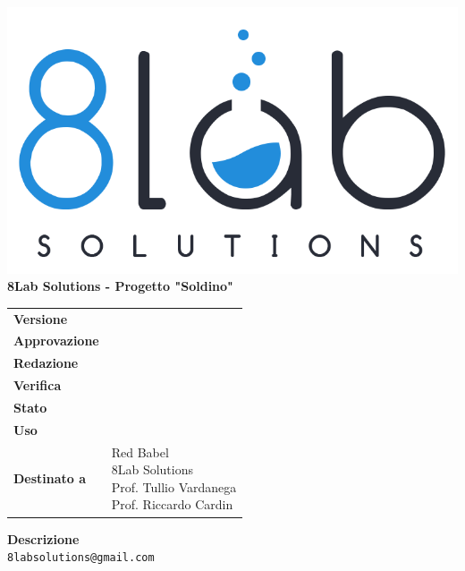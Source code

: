 \thispagestyle{empty}
\begin{titlepage}
	\begin{center}
		\includegraphics[scale = 0.3]{res/images/logo8_crop.png}\\
		\large \textbf{8Lab Solutions - Progetto "Soldino"} \\
		\vfill
		\Huge \textbf{\doctitle}
		\vspace*{\fill}
        
        \vfill
        \large
    \end{center}
	\begin{table}[htbp]
        \centering
        \hspace*{2cm}
        \begin{tabular}{l|l}
            \textbf{Versione} & \rev{} \\
            \textbf{Approvazione} & \approv{} \\
            \textbf{Redazione} & \red{} \\
            \textbf{Verifica} & \ver{} \\
            \textbf{Stato} & \stato{} \\
            \textbf{Uso} & \uso{} \\
            \textbf{Destinato a} & \parbox[t]{5cm}{Red Babel \\8Lab Solutions
            \\Prof. Tullio Vardanega\\Prof. Riccardo Cardin}
        \end{tabular}
    \end{table}
    \begin{center}
        \vfill
        \normalsize
        \textbf{Descrizione}\\
		\describedoc
        \vfill
        \small
        \texttt{8labsolutions@gmail.com}
	\end{center}
\end{titlepage}
